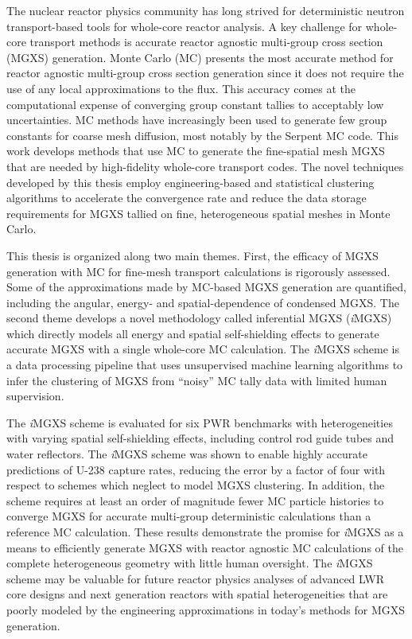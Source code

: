 \begin{abstractpage}

The nuclear reactor physics community has long strived for deterministic neutron transport-based tools for whole-core reactor analysis. A key challenge for whole-core transport methods is accurate reactor agnostic multi-group cross section (MGXS) generation. Monte Carlo (MC) presents the most accurate method for reactor agnostic multi-group cross section generation since it does not require the use of any local approximations to the flux. This accuracy comes at the computational expense of converging group constant tallies to acceptably low uncertainties. MC methods have increasingly been used to generate few group constants for coarse mesh diffusion, most notably by the Serpent MC code. This work develops methods that use MC to generate the fine-spatial mesh MGXS that are needed by high-fidelity whole-core transport codes. The novel techniques developed by this thesis employ engineering-based and statistical clustering algorithms to accelerate the convergence rate and reduce the data storage requirements for MGXS tallied on fine, heterogeneous spatial meshes in Monte Carlo.


This thesis is organized along two main themes. First, the efficacy of MGXS generation with MC for fine-mesh transport calculations is rigorously assessed. Some of the approximations made by MC-based MGXS generation are quantified, including the angular, energy- and spatial-dependence of condensed MGXS. The second theme develops a novel methodology called inferential MGXS (\textit{i}MGXS) which directly models all energy and spatial self-shielding effects to generate accurate MGXS with a single whole-core MC calculation. The \textit{i}MGXS scheme is a data processing pipeline that uses unsupervised machine learning algorithms to infer the clustering of MGXS from ``noisy'' MC tally data with limited human supervision.

The \textit{i}MGXS scheme is evaluated for six PWR benchmarks with heterogeneities with varying spatial self-shielding effects, including control rod guide tubes and water reflectors. The \textit{i}MGXS scheme was shown to enable highly accurate predictions of U-238 capture rates, reducing the error by a factor of four with respect to schemes which neglect to model MGXS clustering. In addition, the scheme requires at least an order of magnitude fewer MC particle histories to converge MGXS for accurate multi-group deterministic calculations than a reference MC calculation. These results demonstrate the promise for \textit{i}MGXS as a means to efficiently generate MGXS with reactor agnostic MC calculations of the complete heterogeneous geometry with little human oversight. The \textit{i}MGXS scheme may be valuable for future reactor physics analyses of advanced LWR core designs and next generation reactors with spatial heterogeneities that are poorly modeled by the engineering approximations in today's methods for MGXS generation.


\end{abstractpage}

